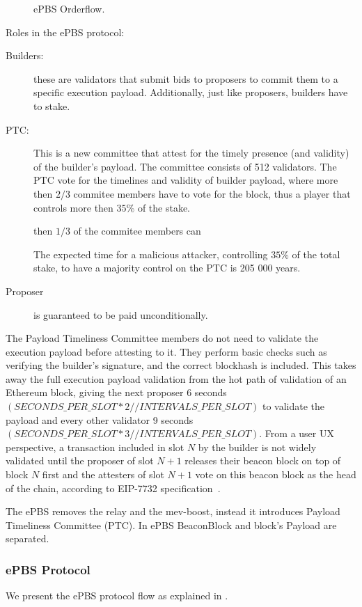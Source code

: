 \begin{figure}[h!]
    \makebox[\textwidth][c]{%
    }
    \label{fig:epbs-mev-boost-orderflow}
    \caption{ePBS Orderflow.}
\end{figure}


Roles in the ePBS protocol:
\begin{description}
    \item[Builders:] these are validators that submit bids to proposers to commit them to a specific execution payload. Additionally, just like proposers, builders have to stake.
    \item[PTC:] This is a new committee that attest for the timely presence (and validity) of the builder's payload. The committee consists of 512 validators. The PTC vote for the timelines and validity of builder payload, where more then $2/3$ commitee members have to vote for the block, thus a player that controls more then $35\%$ of the stake.
    
    then $1/3$ of the commitee members can 

    The expected time for a malicious attacker, controlling $35\%$ of the total stake, to have a majority control on the PTC is 205 000 years.
    \item[Proposer] is guaranteed to be paid unconditionally.
\end{description}


The Payload Timeliness Committee members do not need to validate the execution payload before attesting to it. They perform basic checks such as verifying the builder’s signature, and the correct blockhash is included. This takes away the full execution payload validation from the hot path of validation of an Ethereum block, giving the next proposer 6 seconds $(SECONDS\_PER\_SLOT * 2 // INTERVALS\_PER\_SLOT)$ to validate the payload and every other validator 9 seconds $(SECONDS\_PER\_SLOT * 3 // INTERVALS\_PER\_SLOT)$. From a user UX perspective, a transaction included in slot $N$ by the builder is not widely validated until the proposer of slot $N+1$ releases their beacon block on top of block $N$ first and the attesters of slot $N+1$ vote on this beacon block as the head of the chain, according to EIP-7732 specification~\cite{eip_7732_epbs}.

The ePBS removes the relay and the mev-boost, instead it introduces Payload Timeliness Committee (PTC).
In ePBS BeaconBlock and block's Payload are separated.

\subsubsection{ePBS Protocol}
We present the ePBS protocol flow as explained in \cite{potuz_anatomy_slot}.

